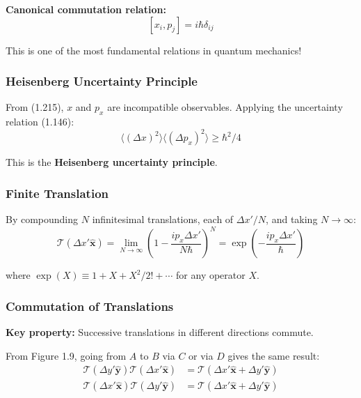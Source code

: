 \documentclass[11pt,a4paper]{article}
\begin{document}
\textbf{Canonical commutation relation:}
\begin{equation}
\boxed{[x_i, p_j] = i\hbar\delta_{ij}}
\tag{1.215}
\end{equation}

This is one of the most fundamental relations in quantum mechanics!

\subsubsection{Heisenberg Uncertainty Principle}

From (1.215), $x$ and $p_x$ are incompatible observables. Applying the uncertainty relation (1.146):
\begin{equation}
\boxed{\langle(\Delta x)^2\rangle\langle(\Delta p_x)^2\rangle \geq \hbar^2/4}
\tag{1.216}
\end{equation}

This is the \textbf{Heisenberg uncertainty principle}.

\subsubsection{Finite Translation}

By compounding $N$ infinitesimal translations, each of $\Delta x'/N$, and taking $N \to \infty$:
\begin{equation}
\mathcal{T}(\Delta x'\hat{\mathbf{x}}) = \lim_{N\to\infty}\left(1 - \frac{ip_x\Delta x'}{N\hbar}\right)^N = \exp\left(-\frac{ip_x\Delta x'}{\hbar}\right)
\tag{1.218}
\end{equation}

where $\exp(X) \equiv 1 + X + X^2/2! + \cdots$ for any operator $X$.

\subsubsection{Commutation of Translations}

\textbf{Key property:} Successive translations in different directions commute.

From Figure 1.9, going from $A$ to $B$ via $C$ or via $D$ gives the same result:
\begin{align}
\mathcal{T}(\Delta y'\hat{\mathbf{y}})\mathcal{T}(\Delta x'\hat{\mathbf{x}}) &= \mathcal{T}(\Delta x'\hat{\mathbf{x}} + \Delta y'\hat{\mathbf{y}}) \tag{1.220} \\
\mathcal{T}(\Delta x'\hat{\mathbf{x}})\mathcal{T}(\Delta y'\hat{\mathbf{y}}) &= \mathcal{T}(\Delta x'\hat{\mathbf{x}} + \Delta y'\hat{\mathbf{y}})
\end{align}
\end{document}
